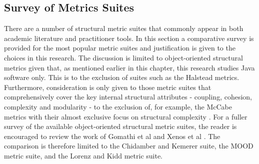 \subsection{Survey of Metrics Suites}
There are a number of structural metric suites that commonly appear in both academic literature and practitioner tools. In this section a comparative survey is provided for the most popular metric suites and justification is given to the choices in this research. The discussion is limited to object-oriented structural metrics given that, as mentioned earlier in this chapter, this research studies Java software only. This is to the exclusion of suites such as the Halstead metrics. Furthermore, consideration is only given to those metric suites that comprehensively cover the key internal structural attributes - coupling, cohesion, complexity and modularity - to the exclusion of, for example, the McCabe metrics with their almost exclusive focus on structural complexity \citep{mccabe1976complexity} \citep{mccabe1989design}. For a fuller survey of the available object-oriented structural metric suites, the reader is encouraged to review the work of Gomathi et al \citep{gomathi2013an} and Xenos et al \citep{xenos2000object}. The comparison is therefore limited to the Chidamber and Kemerer suite, the MOOD metric suite, and the Lorenz and Kidd metric suite.

